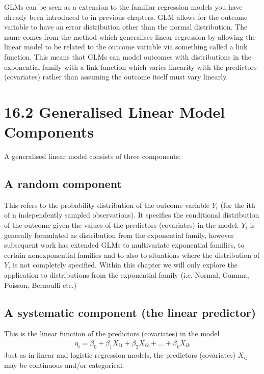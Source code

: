 \documentclass[letterpaper,10pt,english]{jupyterBook}
\begin{document}
\sphinxAtStartPar
GLMs can be seen as a extension to the familiar regression models you have already been introduced to in previous chapters. GLM allows for the outcome variable to have an error distribution other than the normal distribution. The name comes from the method which generalises linear regression by allowing the linear model to be related to the outcome variable via something called a link function. This means that GLMs can model outcomes with distributions in the exponential family with a link function which varies linearity with the predictors (covariates) rather than assuming the outcome itself must vary linearly.


\section{16.2 Generalised Linear Model Components}
\label{\detokenize{16.c. Generalised Linear Model (GLM):generalised-linear-model-components}}\label{\detokenize{16.c. Generalised Linear Model (GLM)::doc}}
\sphinxAtStartPar
A generalised linear model consists of three components:


\subsection{A random component}
\label{\detokenize{16.c. Generalised Linear Model (GLM):a-random-component}}
\sphinxAtStartPar
This refers to the probability distribution of the outcome variable \(Y_{i}\) (for the ith of n independently sampled observations).  It specifies the conditional distribution of the outcome given the values of the predictors (covariates) in the model. \(Y_{i}\) is generally formulated as distribution from the exponential family, however subsequent work has extended GLMs to multivariate exponential families, to certain non\sphinxhyphen{}exponential families and to also to situations where the distribution of \(Y_{i}\) is not completely specified. Within this chapter we will only explore the application to distributions from the exponential family (i.e. Normal, Gamma, Poisson, Bernoulli etc.)


\subsection{A systematic component  (the linear predictor)}
\label{\detokenize{16.c. Generalised Linear Model (GLM):a-systematic-component-the-linear-predictor}}
\sphinxAtStartPar
This is the linear function of the predictors (covariates) in the model
\begin{equation*}
\begin{split}
\eta_{i} = \beta_{0} + \beta_{1}X_{i1} + \beta_{2}X_{i2} + … + \beta_{k}X_{ik}
\end{split}
\end{equation*}
\sphinxAtStartPar
Just as in  linear and logistic regression models, the predictors (covariates) \(X_{ij}\) may be continuous and/or categorical.
\end{document}
